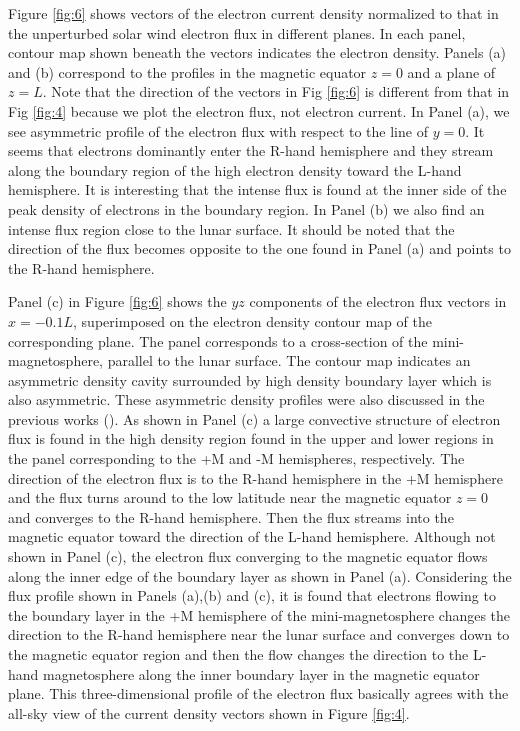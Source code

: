 \documentclass[draft,jgrga]{agutex2015}
\begin{document}
\begin{article}
Figure \ref{fig:6} shows vectors of the electron current density 
%
%
%
normalized to that in the unperturbed solar wind electron flux in different planes.
%
In each panel, contour map shown beneath the vectors indicates the electron density.
Panels (a) and (b) correspond to the profiles 
in the magnetic equator $z=0$ and a plane of $z=L$. 
Note that the direction of the vectors in Fig \ref{fig:6} is
different from that in Fig \ref{fig:4} because 
we plot the electron flux, not electron current.
In Panel (a),  
we see asymmetric profile of the electron flux 
with respect to the line of $y=0$.
It seems that electrons dominantly enter the R-hand hemisphere  
and they stream along the boundary region of the high electron density
toward the L-hand hemisphere.
It is interesting that the intense flux is found at the inner side of 
the peak density of electrons in the boundary region.
In Panel (b)
we also find an intense flux region close to the lunar surface.
It should be noted that the direction of the flux becomes 
opposite to the one found in Panel (a) and points to the R-hand hemisphere.

Panel (c) in Figure \ref{fig:6} shows the $yz$ components of the electron flux 
vectors in $x=-0.1L$, 
superimposed on the electron density contour map of the corresponding plane.
The panel corresponds to a cross-section of the mini-magnetosphere, 
parallel to the lunar surface.
The contour map indicates an asymmetric density cavity 
surrounded by high density boundary layer which is also asymmetric.
These asymmetric density profiles were also discussed in the previous works
(\cite{Deca2014}).
As shown in Panel (c)
a large convective structure of electron flux is found 
in the high density region found in the upper and lower regions in the panel
corresponding to the +M and -M hemispheres, respectively.
The direction of the electron flux is to the R-hand hemisphere in the +M hemisphere and
the flux turns around to the low latitude near the magnetic equator $z=0$
and converges to the R-hand hemisphere.
Then the flux streams into the magnetic equator toward the direction of 
the L-hand hemisphere.
Although not shown in Panel (c), 
the electron flux converging to the magnetic equator flows 
along the inner edge of the boundary layer as shown in Panel (a).
Considering the flux profile shown in Panels (a),(b) and (c), 
it is found that electrons flowing 
to the boundary layer in the +M hemisphere of the mini-magnetosphere
changes the direction to the R-hand hemisphere 
near the lunar surface and converges down to the magnetic equator region 
and then the flow changes the direction to the L-hand magnetosphere
along the inner boundary layer in the magnetic equator plane.
This three-dimensional profile of the electron flux basically 
agrees with the all-sky view of the current density vectors 
shown in Figure \ref{fig:4}.


\end{article}
\end{document}
